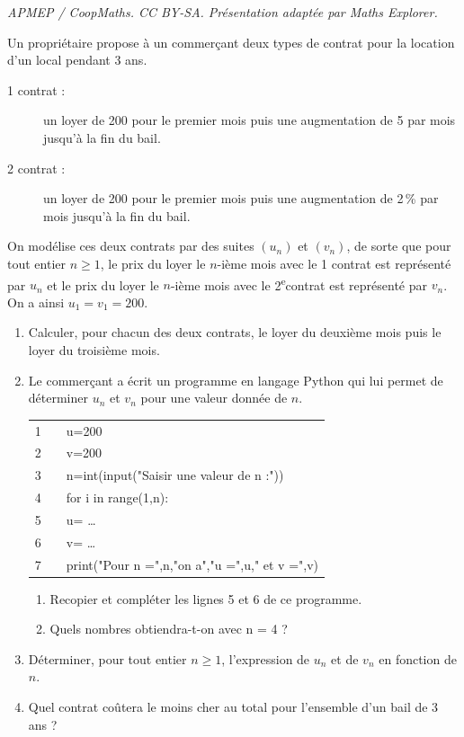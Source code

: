 \documentclass[10pt]{article}
\providecommand{\euro}{\texteuro}
\providecommand{\ieme}{\textsuperscript{e}}
\providecommand{\euro}{{\text{€}}}
\providecommand{\dotfill}{\ldots}
\renewcommand{\euro}{\ifmmode\text{\texteuro}\else\texteuro\fi}
\begin{document}
\noindent\textit{APMEP / CoopMaths. CC BY-SA. Présentation adaptée par Maths Explorer.}\par\medskip
\medskip

Un propriétaire propose à un commerçant deux types de contrat pour la location d'un local pendant 3 ans.

\begin{description}
\item[1 contrat :]

un loyer de 200 \euro{} pour le premier mois puis une augmentation de 5 \euro{} par mois jusqu'à la fin du bail.

\item [2 contrat :]

 un loyer de 200 \euro{} pour le premier mois puis une augmentation de 2\,\% par mois jusqu'à la fin du bail.
\end{description}
On modélise ces deux contrats par des suites $\left(u_n\right)$ et $\left(v_n\right)$, de sorte que pour tout entier $n\geqslant 1$, le prix du loyer le $n$-ième mois avec le 1 contrat est représenté par $u_n$ et le prix du loyer le $n$-ième mois avec le 2\ieme contrat est représenté par $v_n$.
On a ainsi $u_1=v_1=200$.

\medskip

\begin{enumerate}
\item  Calculer, pour chacun des deux contrats, le loyer du deuxième mois puis le loyer du troisième mois.
\item Le commerçant a écrit un programme en langage Python qui lui permet de déterminer $u_n$ et $v_n$ pour une valeur donnée de $n$.
\begin{center}
\begin{tabular}[]{|ccl|}
\hline
1& & u=200 \\
2& &v=200\\
3& &n=int(input("Saisir une valeur de n :"))\\
4& &for i in range(1,n):\\
5& &\hspace{1.5em}u= \dotfill\\
6& &\hspace{1.5em}v= \dotfill \\
7& &print("Pour n =",n,"on a","u =",u," et v =",v)\\
\hline
\end{tabular}
\end{center}

\begin{enumerate}
\item Recopier et compléter les lignes 5 et 6 de ce programme.
\item Quels nombres obtiendra-t-on avec n = 4 ?
\end{enumerate}
\item Déterminer, pour tout entier $n\geqslant 1$, l'expression de $u_n$ et de $v_n$ en fonction de $n$.
\item Quel contrat coûtera le moins cher au total pour l'ensemble d'un bail de 3 ans ?
\end{enumerate}

\vspace{0,5cm}
\end{document}
